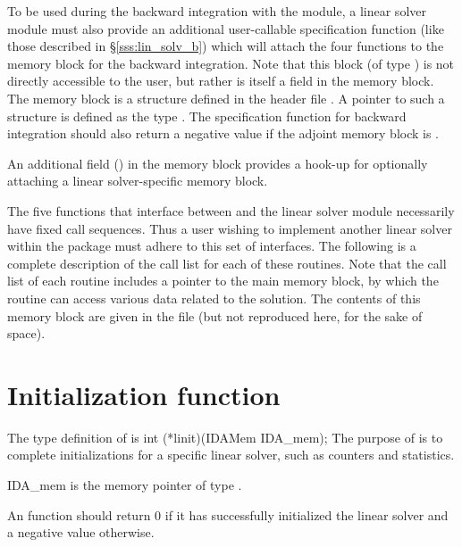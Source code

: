 To be used during the backward integration with the {\idas} module,
a linear solver module must also provide an additional user-callable
specification function (like those described in
\S\ref{sss:lin_solv_b}) which will attach the four functions to the
{\idas} memory block for the backward integration. Note that this
block (of type ) is not directly accessible to
the user, but rather is itself a field in the
{\idas} memory block.  The {\idas} memory block is a structure
defined in the header file .  A pointer to such a
structure is defined as the type .
The specification function for backward integration should also return
a negative value if the adjoint {\idas} memory block is .

An additional field () in the {\idas} memory block
provides a hook-up for optionally attaching a linear solver-specific
memory block.

The five functions that interface between {\idas} and the linear solver module
necessarily have fixed call sequences.  Thus a user wishing to implement another 
linear solver within the {\idas} package must adhere to this set of interfaces.
The following is a complete description of the call list for each of
these routines.  Note that the call list of each routine includes a
pointer to the main {\idas} memory block, by which the routine can access
various data related to the {\idas} solution.  The contents of this memory
block are given in the file  (but not reproduced here, for
the sake of space).


\section{Initialization function}
The type definition of  is
{
  int (*linit)(IDAMem IDA\_mem);
}
{
  The purpose of  is to complete initializations for      
  a specific linear solver, such as counters and statistics.        
}
{
  \begin{args}
  \item[IDA\_mem]
    is the {\idas} memory pointer of type .
  \end{args}
}
{
  An  function should return $0$ if it 
  has successfully initialized the {\idas} linear solver and 
  a negative value otherwise. 
}
{}

